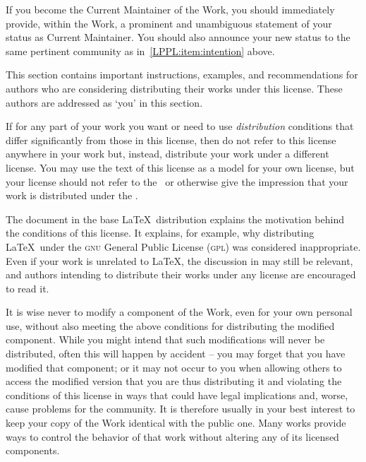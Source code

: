 \begin{LPPLicense}
    If you become the Current Maintainer of the Work, you should immediately
    provide, within the Work, a prominent and unambiguous statement of your
    status as Current Maintainer.  You should also announce your new status to
    the same pertinent community as in~\ref{LPPL:item:intention} above.


    \label{LPPL:Distribute}

    This section contains important instructions, examples, and recommendations
    for authors who are considering distributing their works under this
    license.  These authors are addressed as `you' in this section.


    \label{LPPL:Choosing}

    If for any part of your work you want or need to use \emph{distribution}
    conditions that differ significantly from those in this license, then do
    not refer to this license anywhere in your work but, instead, distribute
    your work under a different license. You may use the text of this license
    as a model for your own license, but your license should not refer to the
    \LPPL\ or otherwise give the impression that your work is distributed under
    the \LPPL.

    The document  in the base \LaTeX\ distribution
    explains the motivation behind the conditions of this license.  It
    explains, for example, why distributing \LaTeX\ under the \textsc{gnu}
    General Public License (\textsc{gpl}) was considered inappropriate.  Even
    if your work is unrelated to \LaTeX, the discussion in
     may still be relevant, and authors intending to
    distribute their works under any license are encouraged to read it.


    \label{LPPL:WithoutDistribution}

    It is wise never to modify a component of the Work, even for your own
    personal use, without also meeting the above conditions for distributing
    the modified component.  While you might intend that such modifications
    will never be distributed, often this will happen by accident -- you may
    forget that you have modified that component; or it may not occur to you
    when allowing others to access the modified version that you are thus
    distributing it and violating the conditions of this license in ways that
    could have legal implications and, worse, cause problems for the community.
    It is therefore usually in your best interest to keep your copy of the Work
    identical with the public one.  Many works provide ways to control the
    behavior of that work without altering any of its licensed components.



\end{LPPLicense}
